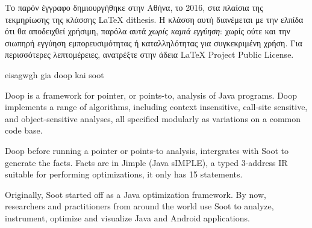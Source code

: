 \documentclass{dithesis}
\begin{document}
\tableofcontents
\listoffigures
\listoftables

\begin{thesisprologue}[Πρόλογος]
    Το παρόν έγγραφο δημιουργήθηκε στην Αθήνα, το 2016, στα πλαίσια της 
    τεκμηρίωσης της κλάσσης \LaTeX{} dithesis.
    Η κλάσση αυτή διανέμεται με την ελπίδα ότι θα αποδειχθεί χρήσιμη, παρόλα αυτά 
    \emph{χωρίς καμιά εγγύηση}: χωρίς ούτε και την σιωπηρή εγγύηση 
    εμπορευσιμότητας ή καταλληλότητας για συγκεκριμένη χρήση.
    Για περισσότερες λεπτομέρειες, ανατρέξτε στην άδεια LaTeX Project Public 
    License.
\end{thesisprologue}

    eisagwgh gia doop kai soot

    Doop is a framework for pointer, or points-to, analysis of Java programs. 
    Doop implements a range of algorithms, including context insensitive, call-site sensitive, 
    and object-sensitive analyses, all specified modularly as variations on a common code base.
    
        Doop before running a pointer or points-to analysis, intergrates with Soot to generate
        the facts. Facts are in Jimple (Java sIMPLE), a typed 3-address IR suitable for performing
        optimizations, it only has 15 statements.




    Originally, Soot started off as a Java optimization framework. By now, researchers and 
    practitioners from around the world use Soot to analyze, instrument, optimize and 
    visualize Java and Android applications.
\end{document}
